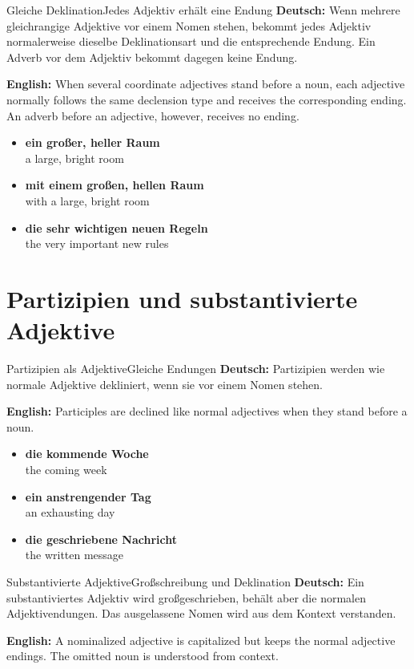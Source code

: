 \documentclass[a4paper,11pt]{article}
\newcommand{\GermanText}[1]{\textbf{Deutsch: }#1\par}
\newcommand{\EnglishText}[1]{{\small\color{SoftGray}\textbf{English: }#1\par}}
\newcommand{\ExampleItem}[2]{\item \textbf{#1}\\{\small\color{SoftGray}#2}}
\begin{document}
        \begin{grammarentry}{Gleiche Deklination}{Jedes Adjektiv erhält eine Endung}
            \GermanText{Wenn mehrere gleichrangige Adjektive vor einem Nomen stehen, bekommt jedes Adjektiv normalerweise dieselbe Deklinationsart und die entsprechende Endung. Ein Adverb vor dem Adjektiv bekommt dagegen keine Endung.}
            \EnglishText{When several coordinate adjectives stand before a noun, each adjective normally follows the same declension type and receives the corresponding ending. An adverb before an adjective, however, receives no ending.}
        \end{grammarentry}

        \begin{exbox}
            \begin{itemize}
                \ExampleItem{ein großer, heller Raum}{a large, bright room}
                \ExampleItem{mit einem großen, hellen Raum}{with a large, bright room}
                \ExampleItem{die sehr wichtigen neuen Regeln}{the very important new rules}
            \end{itemize}
        \end{exbox}

    \section{Partizipien und substantivierte Adjektive}

        \begin{grammarentry}{Partizipien als Adjektive}{Gleiche Endungen}
            \GermanText{Partizipien werden wie normale Adjektive dekliniert, wenn sie vor einem Nomen stehen.}
            \EnglishText{Participles are declined like normal adjectives when they stand before a noun.}
        \end{grammarentry}

        \begin{exbox}
            \begin{itemize}
                \ExampleItem{die kommende Woche}{the coming week}
                \ExampleItem{ein anstrengender Tag}{an exhausting day}
                \ExampleItem{die geschriebene Nachricht}{the written message}
            \end{itemize}
        \end{exbox}

        \begin{grammarentry}{Substantivierte Adjektive}{Großschreibung und Deklination}
            \GermanText{Ein substantiviertes Adjektiv wird großgeschrieben, behält aber die normalen Adjektivendungen. Das ausgelassene Nomen wird aus dem Kontext verstanden.}
            \EnglishText{A nominalized adjective is capitalized but keeps the normal adjective endings. The omitted noun is understood from context.}
        \end{grammarentry}
\end{document}

